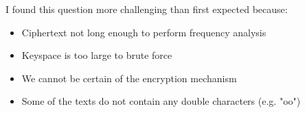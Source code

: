 \documentclass[12pt,a4paper,twoside]{article}
\begin{document}
I found this question more challenging than first expected because:
\begin{itemize}
\item Ciphertext not long enough to perform frequency analysis
\item Keyspace is too large to brute force
\item We cannot be certain of the encryption mechanism
\item Some of the texts do not contain any double characters (e.g. "oo")
\end{itemize}


%
%
%



\end{document}
